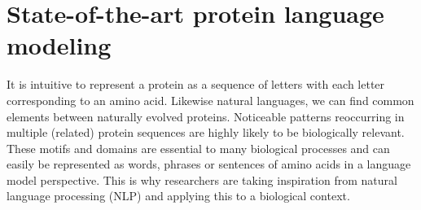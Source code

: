 \section{State-of-the-art protein language modeling}
It is intuitive to represent a protein as a sequence of letters with each letter corresponding to an amino acid. Likewise natural languages, we can find common elements between naturally evolved proteins. Noticeable patterns reoccurring in multiple (related) protein sequences are highly likely to be biologically relevant. These motifs and domains are essential to many biological processes and can easily be represented as words, phrases or sentences of amino acids in a language model perspective. This is why researchers are taking inspiration from natural language processing (NLP) and applying this to a biological context.